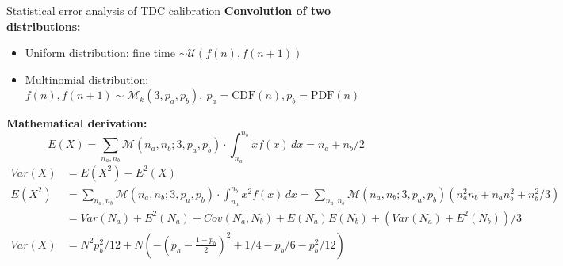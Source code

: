 \documentclass{ikpKoeln}
\begin{document}
\begin{frame}[t]{Statistical error analysis of TDC calibration}
	\flushleft \textbf{Convolution of two distributions:}
	\begin{itemize}
		\item Uniform distribution: fine time $\sim \mathcal{U}(f(n), f(n + 1))$
		\item Multinomial distribution: $f(n), f(n+1) \sim \mathcal{M}_k(3,p_a, p_b), \ p_a = \text{CDF}(n), p_b = \text{PDF}(n)$
	\end{itemize}

	\flushleft \textbf{Mathematical derivation:}
	\scriptsize{
		$$ E(X) = \sum_{n_a, n_b} \mathcal{M}(n_a,n_b;3,p_a, p_b) \cdot \int_{n_a}^{n_b} xf(x) \,dx = \bar{n_a} + \bar{n_b} / 2 $$
	}
	{
		\scriptsize
		\begin{align*}
			Var(X) & = E(X^2) - E^2(X)                                                                                                                                                      \\
			E(X^2) & = \sum_{n_a, n_b} \mathcal{M}(n_a,n_b;3,p_a, p_b) \cdot \int_{n_a}^{n_b} x^2f(x) \,dx = \sum_{n_a, n_b} \mathcal{M}(n_a,n_b;3,p_a, p_b)(n_a^2n_b + n_an_b^2 + n_b^2/3) \\
			       & = Var(N_a) + E^2(N_a) + Cov(N_a, N_b) + E(N_a)E(N_b) + \left(Var(N_a) + E^2(N_b)\right)/3                                                                              \\
			Var(X) & = N^2 p_b^2 / 12 + N \left( -(p_a - \frac{1-p_b}{2})^2 + 1/4 - p_b / 6 - p_b^2 /12 \right)
		\end{align*}
	}%

\end{frame}
\end{document}
